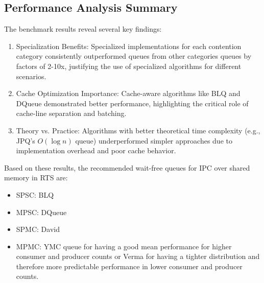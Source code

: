 \subsection{Performance Analysis Summary}
The benchmark results reveal several key findings:

\begin{enumerate}
\item Specialization Benefits: Specialized implementations for each contention category consistently outperformed queues from other categories queues by factors of 2-10x, justifying the use of specialized algorithms for different scenarios.

\item Cache Optimization Importance: Cache-aware algorithms like \ac{BLQ} and DQueue demonstrated better performance, highlighting the critical role of cache-line separation and batching.

\item Theory vs. Practice: Algorithms with better theoretical time complexity (e.g., \ac{JPQ}'s $O(\log n)$ queue) underperformed simpler approaches due to implementation overhead and poor cache behavior.
\end{enumerate}

Based on these results, the recommended wait-free queues for \ac{IPC} over shared memory in \ac{RTS} are:
\begin{itemize}
\item \ac{SPSC}: \ac{BLQ}
\item \ac{MPSC}: DQueue
\item \ac{SPMC}: David
\item \ac{MPMC}: \ac{YMC} queue for having a good mean performance for higher consumer and producer counts or Verma for having a tighter distribution and therefore more predictable performance in lower consumer and producer counts.
\end{itemize}
